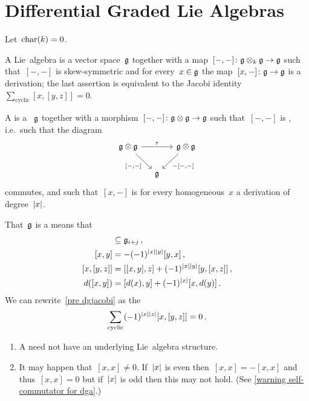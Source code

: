 \documentclass[a4paper,10pt,headings=standardclasses]{scrartcl}
\begin{document}
\section{Differential Graded Lie Algebras}

Let~$\operatorname{char}(k) = 0$.

\begin{recall}
  A Lie~algebra is a vector space~$\mathfrak{g}$ together with a map~$[-,-] \colon \mathfrak{g} \otimes_k \mathfrak{g} \to \mathfrak{g}$ such that~$[-,-]$ is skew-symmetric and for every~$x \in \mathfrak{g}$ the map~$[x,-] \colon \mathfrak{g} \to \mathfrak{g}$ is a derivation;
  the last assertion is equivalent to the Jacobi identity~$\sum_{\text{cyclic}} [x,[y,z]] = 0$.
\end{recall}

\begin{definition}
  A  is a {\dgv}~$\mathfrak{g}$ together with a morphism~$[-,-] \colon \mathfrak{g} \otimes \mathfrak{g} \to \mathfrak{g}$ such that~$[-,-]$ is , i.e.\ such that the diagram
  \[
    \begin{tikzcd}[column sep = small]
      \glie \tensor \glie
      \arrow{rr}[above]{\tau}
      \arrow{dr}[below left]{[-,-]}
      &
      {}
      &
      \glie \tensor \glie
      \arrow{dl}[below right]{-[-,-]}
      \\
      {}
      &
      \glie
      &
      {}
    \end{tikzcd}
  \]
  commutes, and such that~$[x,-]$ is for every homogeneous~$x$ a derivation of degree~$\lvert x\rvert$.
\end{definition}

\begin{remark}
  That~$\mathfrak{g}$ is a {\dgl} means that
  \begin{align}
    [\glie_i, \glie_j]
    &\subseteq
    \glie_{i+j} \,,
    \notag
  \\
    [x,y]
    &=
    -(-1)^{\hdeg{x} \hdeg{y}} [y,x] \,,
    \notag
  \\
    [x, [y,z]]
    &=
    [[x,y], z]
    +
    (-1)^{\hdeg{x} \hdeg{y}}
    [y, [x,z]] \,,
    \label{pre dgjacobi}
  \\
    d([x,y])
    &=
    [d(x), y] + (-1)^{\hdeg{x}} [x, d(y)] \,.
    \notag
  \end{align}
  We can rewrite~\eqref{pre dgjacobi} as the 
  \[
    \sum_{\text{cyclic}}
    (-1)^{\lvert x\rvert \lvert z\rvert} [x, [y,z]]
    =
    0 \,.
  \]
\end{remark}

\begin{warning}
  \leavevmode
  \begin{enumerate}
    \item
      A {\dgl} need not have an underlying Lie~algebra structure.
    \item
      It may happen that~$[x,x] \neq 0$.
      If~$\lvert x\rvert$ is even then~$[x,x] = -[x,x]$ and thus~$[x,x] = 0$ but if~$\lvert x\rvert$ is odd then this may not hold.
      (See \cref{warning self-commutator for dga}.)
  \end{enumerate}
\end{warning}
\end{document}
